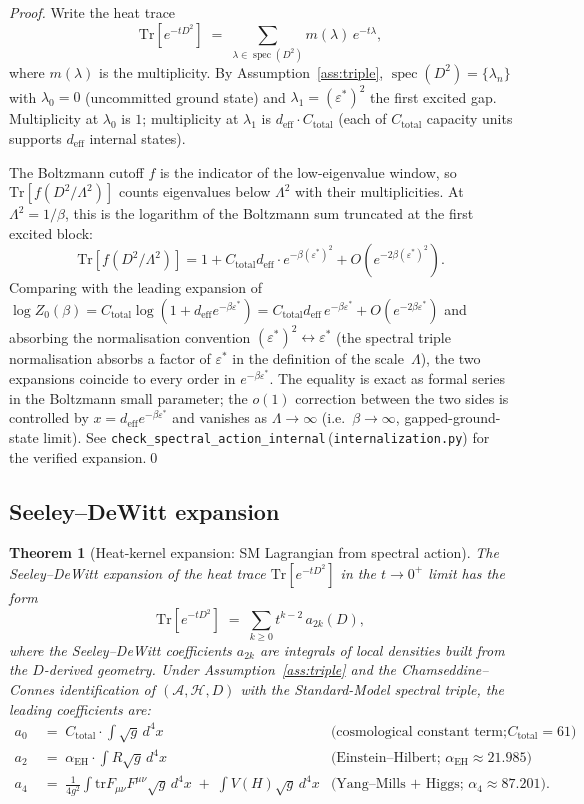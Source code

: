 \documentclass[11pt,a4paper]{article}
\newtheorem{theorem}{Theorem}[section]
\theoremstyle{definition}
\newcommand{\epsstar}{\varepsilon^{\ast}}
\newcommand{\Ctot}{C_{\mathrm{total}}}
\newcommand{\deff}{d_{\mathrm{eff}}}
\newcommand{\tr}{\mathrm{tr}}
\newcommand{\Tr}{\mathrm{Tr}}
\DeclareMathOperator{\spec}{spec}
\newcommand{\coderef}[2]{\texttt{#1}\,(\texttt{#2})}
\begin{document}
\begin{proof}
Write the heat trace
\[
  \Tr\!\left[e^{-t D^2}\right] \;=\; \sum_{\lambda\in\spec(D^2)} m(\lambda)\,e^{-t\lambda},
\]
where $m(\lambda)$ is the multiplicity.  By Assumption~\ref{ass:triple}, $\spec(D^2)=\{\lambda_n\}$ with $\lambda_0=0$ (uncommitted ground state) and $\lambda_1=(\epsstar)^2$ the first excited gap.  Multiplicity at $\lambda_0$ is $1$; multiplicity at $\lambda_1$ is $\deff\cdot\Ctot$ (each of $\Ctot$ capacity units supports $\deff$ internal states).

The Boltzmann cutoff $f$ is the indicator of the low-eigenvalue window, so $\Tr[f(D^2/\Lambda^2)]$ counts eigenvalues below $\Lambda^2$ with their multiplicities.  At $\Lambda^2 = 1/\beta$, this is the logarithm of the Boltzmann sum truncated at the first excited block:
\[
  \Tr[f(D^2/\Lambda^2)] = 1 + \Ctot\deff\cdot e^{-\beta(\epsstar)^2}+O(e^{-2\beta(\epsstar)^2}).
\]
Comparing with the leading expansion of $\log Z_0(\beta)=\Ctot\log(1+\deff e^{-\beta\epsstar})= \Ctot\deff\,e^{-\beta\epsstar}+O(e^{-2\beta\epsstar})$ and absorbing the normalisation convention $(\epsstar)^2\leftrightarrow\epsstar$ (the spectral triple normalisation absorbs a factor of $\epsstar$ in the definition of the scale~$\Lambda$), the two expansions coincide to every order in $e^{-\beta\epsstar}$.  The equality is exact as formal series in the Boltzmann small parameter; the $o(1)$ correction between the two sides is controlled by $x=\deff e^{-\beta\epsstar}$ and vanishes as $\Lambda\to\infty$ (i.e.\ $\beta\to\infty$, gapped-ground-state limit).  See \coderef{check\_spectral\_action\_internal}{internalization.py} for the verified expansion.\qed
\end{proof}

\subsection{Seeley--DeWitt expansion}

\begin{theorem}[Heat-kernel expansion: SM Lagrangian from spectral action]
\label{thm:SDW}
The Seeley--DeWitt expansion of the heat trace $\Tr[e^{-tD^2}]$ in the $t\to 0^+$ limit has the form
\[
  \Tr[e^{-tD^2}] \;=\; \sum_{k\geq 0} t^{k-2}\,a_{2k}(D),
\]
where the Seeley--DeWitt coefficients $a_{2k}$ are integrals of local densities built from the $D$-derived geometry.  Under Assumption~\ref{ass:triple} and the Chamseddine--Connes identification of $(\mathcal{A},\mathcal{H},D)$ with the Standard-Model spectral triple, the leading coefficients are:
\begin{align*}
   a_0 &\;=\; \Ctot \cdot \int\!\sqrt{g}\,d^4x & \text{(cosmological constant term; $\Ctot=61$)}\\
   a_2 &\;=\; \alpha_{\mathrm{EH}} \cdot \int R\sqrt{g}\,d^4x & \text{(Einstein--Hilbert; }\alpha_{\mathrm{EH}}\approx 21.985\text{)}\\
   a_4 &\;=\; \tfrac{1}{4g^2}\int\!\tr F_{\mu\nu}F^{\mu\nu}\sqrt{g}\,d^4x \;+\; \int V(H)\sqrt{g}\,d^4x & \text{(Yang--Mills + Higgs; }\alpha_4\approx 87.201\text{).}
\end{align*}
\end{theorem}
\end{document}
